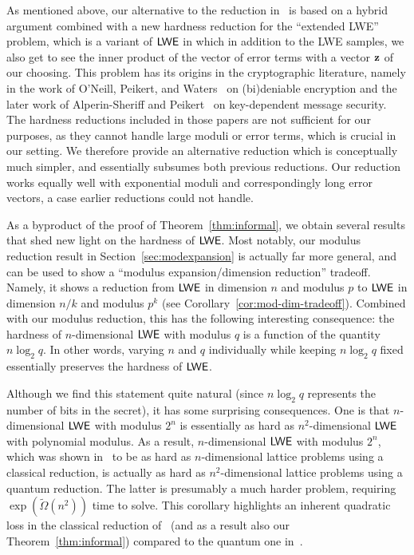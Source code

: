 As mentioned above, our alternative to the reduction
in~\cite{DBLP:conf/innovations/GoldwasserKPV10} is based
on a hybrid argument combined with a new hardness reduction
for the ``extended LWE'' problem, which is a variant of $\mathsf{LWE}$ in which in addition to the LWE samples, we also get to see the inner product
of the vector of error terms with a vector $\mathbf{z}$ of our 
choosing. This problem has
its origins in the cryptographic literature, namely
in the work of O'Neill, Peikert, and Waters~\cite{DBLP:conf/crypto/ONeillPW11} on (bi)deniable encryption
and the later work of Alperin-Sheriff and Peikert~\cite{DBLP:conf/pkc/Alperin-SheriffP12}
on key-dependent message security. The hardness reductions included in those
papers are not sufficient for our purposes, as they cannot handle
large moduli or error terms, which is crucial in our setting. We therefore
provide an alternative reduction which is conceptually much simpler, and
essentially subsumes both previous reductions.
Our reduction works equally well with
exponential moduli and correspondingly long error vectors, a case earlier reductions could not handle.



As a byproduct of the proof of Theorem~\ref{thm:informal}, we obtain several results that
shed new light on the hardness of $\mathsf{LWE}$. Most notably, our modulus reduction result
in Section~\ref{sec:modexpansion} is actually far more general, and can be used to show
a ``modulus expansion/dimension reduction'' tradeoff. Namely, it shows a reduction
from $\mathsf{LWE}$ in dimension $n$ and modulus $p$ to $\mathsf{LWE}$ in dimension $n/k$ and modulus $p^k$ (see Corollary~\ref{cor:mod-dim-tradeoff}).
Combined with our modulus reduction, this has the following interesting consequence:
the hardness of $n$-dimensional $\mathsf{LWE}$ with modulus $q$ is a function of the quantity $n \log_2 q$.
In other words, varying $n$ and $q$ individually while keeping $n \log_2 q$ fixed
essentially preserves the hardness of $\mathsf{LWE}$.

Although we find this statement quite
natural (since $n \log_2 q$ represents the number of bits in the secret), it has
some surprising consequences. One is that $n$-dimensional $\mathsf{LWE}$ with modulus $2^n$
is essentially as hard as $n^2$-dimensional $\mathsf{LWE}$ with polynomial modulus.
As a result, $n$-dimensional $\mathsf{LWE}$ with modulus $2^n$, which was shown
in~\cite{DBLP:conf/stoc/Peikert09} to be as hard as $n$-dimensional lattice
problems using a classical reduction, is actually as hard as $n^2$-dimensional
lattice problems using a quantum reduction. The latter is presumably a much
harder problem, requiring $\exp(\widetilde\Omega(n^2))$ time to solve.
This corollary highlights an inherent quadratic loss in the classical reduction
of~\cite{DBLP:conf/stoc/Peikert09} (and as a result also our Theorem~\ref{thm:informal})
compared to the quantum one in~\cite{DBLP:journals/jacm/Regev09}.

